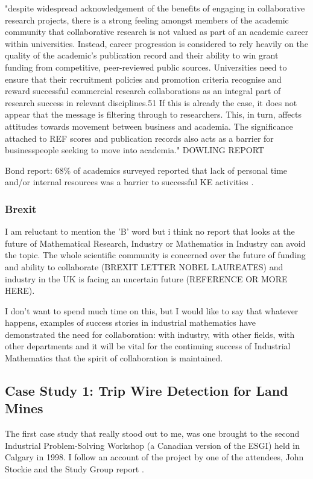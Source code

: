 \documentclass[11pt]{article} %
\begin{document}
	
	"despite widespread acknowledgement of the benefits of engaging
	in collaborative research projects, there is a strong feeling amongst members of the
	academic community that collaborative research is not valued as part of an academic
	career within universities. Instead, career progression is considered to rely heavily on
	the quality of the academic’s publication record and their ability to win grant funding
	from competitive, peer-reviewed public sources. Universities need to ensure that their
	recruitment policies and promotion criteria recognise and reward successful commercial
	research collaborations as an integral part of research success in relevant disciplines.51
	If this is already the case, it does not appear that the message is filtering through to
	researchers. This, in turn, affects attitudes towards movement between business and
	academia. The significance attached to REF scores and publication records also acts as a
	barrier for businesspeople seeking to move into academia."  DOWLING REPORT 
	
	Bond report: 68\% of academics surveyed reported that lack of personal time and/or internal resources was a barrier to successful KE activities .
	
	\subsubsection{Brexit}
	I am reluctant to mention the 'B' word but i think no report that looks at the future of Mathematical Research, Industry or Mathematics in Industry can avoid the topic. The whole scientific community is concerned over the future of funding and ability to collaborate (BREXIT LETTER NOBEL LAUREATES) and industry in the UK is facing an uncertain future (REFERENCE OR MORE HERE).
	
	I don't want to spend much time on this, but I would like to say that whatever happens, examples of success stories in industrial mathematics have demonstrated the need for collaboration: with industry, with other fields, with other departments and it will be vital for the continuing success of Industrial Mathematics that the spirit of collaboration is maintained. 
	
	\subsection{Case Study 1: Trip Wire Detection for Land Mines \label{landmines}}
	
	The first case study that really stood out to me, was one brought to the second Industrial Problem-Solving Workshop (a Canadian version of the ESGI) held in Calgary in 1998. I follow an account of the project by one of the attendees, John Stockie \cite{Stockie2015} and the Study Group report \cite{Jessop}.
	
\end{document}

